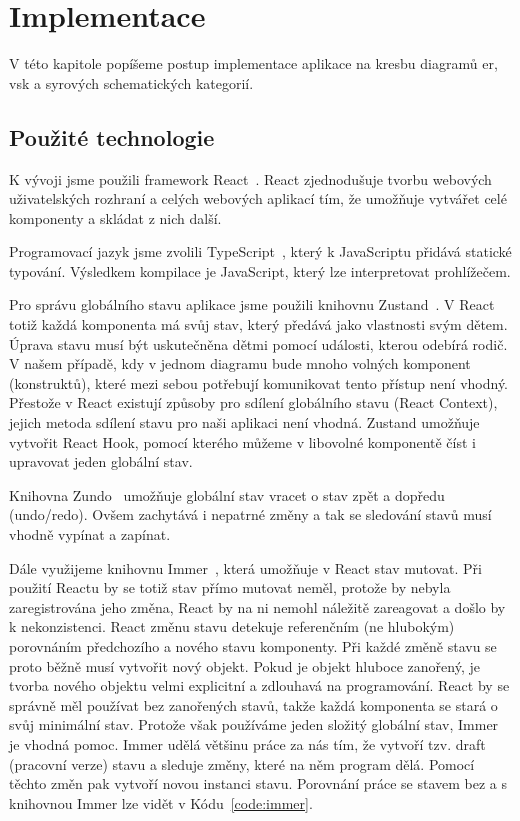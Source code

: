 \chapter{Implementace}\label{chapter:implementace}

V této kapitole popíšeme postup implementace aplikace na kresbu diagramů \acrfull{er}, \acrfull{vsk} a syrových schematických kategorií.

\section{Použité technologie}

K vývoji jsme použili framework React~\cite{react_2023}.
React zjednodušuje tvorbu webových uživatelských rozhraní a celých webových aplikací tím, že umožňuje vytvářet celé komponenty a skládat z nich další.

Programovací jazyk jsme zvolili TypeScript~\cite{microsoft_typescriptjavascript_2023}, který k JavaScriptu přidává statické typování.
Výsledkem kompilace je JavaScript, který lze interpretovat prohlížečem.

Pro správu globálního stavu aplikace jsme použili knihovnu Zustand~\cite{daishikato_zustand_2023}.
V React totiž každá komponenta má svůj stav, který předává jako vlastnosti svým dětem.
Úprava stavu musí být uskutečněna dětmi pomocí události, kterou odebírá rodič.
V našem případě, kdy v jednom diagramu bude mnoho volných komponent (konstruktů), které mezi sebou potřebují komunikovat tento přístup není vhodný.
Přestože v React existují způsoby pro sdílení globálního stavu (React Context), jejich metoda sdílení stavu pro naši aplikaci není vhodná.
Zustand umožňuje vytvořit React Hook, pomocí kterého můžeme v libovolné komponentě číst i upravovat jeden globální stav.

Knihovna Zundo~\cite{kornoelje_zundo_2023} umožňuje globální stav vracet o stav zpět a dopředu (undo/redo).
Ovšem zachytává i nepatrné změny a tak se sledování stavů musí vhodně vypínat a zapínat.

Dále využijeme knihovnu Immer~\cite{michelweststrate_immer_2023}, která umožňuje v React stav mutovat.
Při použití Reactu by se totiž stav přímo mutovat neměl, protože by nebyla zaregistrována jeho změna, React by na ni nemohl náležitě zareagovat a došlo by k nekonzistenci.
React změnu stavu detekuje referenčním (ne hlubokým) porovnáním předchozího a nového stavu komponenty.
Při každé změně stavu se proto běžně musí vytvořit nový objekt.
Pokud je objekt hluboce zanořený, je tvorba nového objektu velmi explicitní a zdlouhavá na programování.
React by se správně měl používat bez zanořených stavů, takže každá komponenta se stará o svůj minimální stav.
Protože však používáme jeden složitý globální stav, Immer je vhodná pomoc.
Immer udělá většinu práce za nás tím, že vytvoří tzv. draft (pracovní verze) stavu a sleduje změny, které na něm program dělá.
Pomocí těchto změn pak vytvoří novou instanci stavu.
Porovnání práce se stavem bez a s knihovnou Immer lze vidět v Kódu~\ref{code:immer}.

